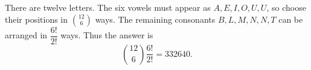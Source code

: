There are twelve letters. The six vowels must appear as $A,E,I,O,U,U$, so choose their positions in $\binom{12}{6}$ ways. The remaining consonants $B,L,M,N,N,T$ can be arranged in $\dfrac{6!}{2!}$ ways. Thus the answer is
\[
\boxed{\binom{12}{6}\dfrac{6!}{2!}=332640}.
\]
